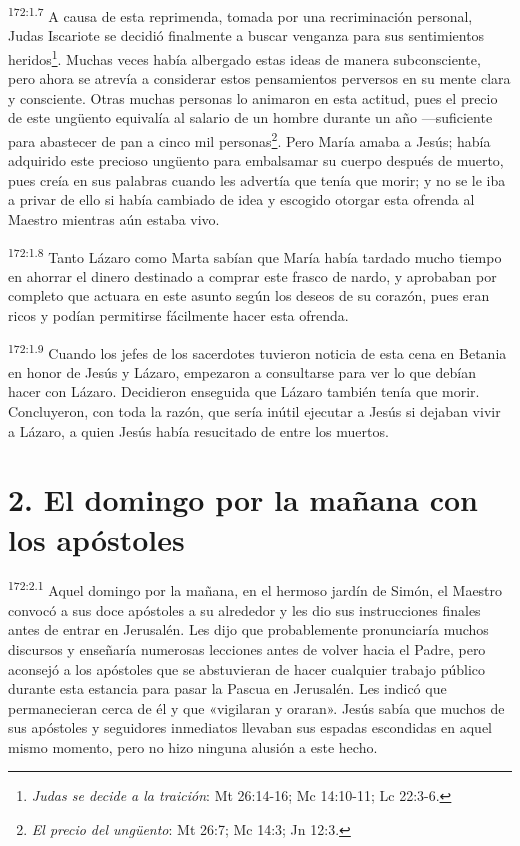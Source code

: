 \par
\textsuperscript{172:1.7} A causa de esta reprimenda, tomada por una recriminación personal, Judas Iscariote se decidió finalmente a buscar venganza para sus sentimientos heridos\footnote{\textit{Judas se decide a la traición}: Mt 26:14-16; Mc 14:10-11; Lc 22:3-6.}. Muchas veces había albergado estas ideas de manera subconsciente, pero ahora se atrevía a considerar estos pensamientos perversos en su mente clara y consciente. Otras muchas personas lo animaron en esta actitud, pues el precio de este ung\"uento equivalía al salario de un hombre durante un año ---suficiente para abastecer de pan a cinco mil personas\footnote{\textit{El precio del ung\"uento}: Mt 26:7; Mc 14:3; Jn 12:3.}. Pero María amaba a Jesús; había adquirido este precioso ung\"uento para embalsamar su cuerpo después de muerto, pues creía en sus palabras cuando les advertía que tenía que morir; y no se le iba a privar de ello si había cambiado de idea y escogido otorgar esta ofrenda al Maestro mientras aún estaba vivo.

\par
\textsuperscript{172:1.8} Tanto Lázaro como Marta sabían que María había tardado mucho tiempo en ahorrar el dinero destinado a comprar este frasco de nardo, y aprobaban por completo que actuara en este asunto según los deseos de su corazón, pues eran ricos y podían permitirse fácilmente hacer esta ofrenda.

\par
\textsuperscript{172:1.9} Cuando los jefes de los sacerdotes tuvieron noticia de esta cena en Betania en honor de Jesús y Lázaro, empezaron a consultarse para ver lo que debían hacer con Lázaro. Decidieron enseguida que Lázaro también tenía que morir. Concluyeron, con toda la razón, que sería inútil ejecutar a Jesús si dejaban vivir a Lázaro, a quien Jesús había resucitado de entre los muertos.

\section*{2. El domingo por la mañana con los apóstoles}
\par
\textsuperscript{172:2.1} Aquel domingo por la mañana, en el hermoso jardín de Simón, el Maestro convocó a sus doce apóstoles a su alrededor y les dio sus instrucciones finales antes de entrar en Jerusalén. Les dijo que probablemente pronunciaría muchos discursos y enseñaría numerosas lecciones antes de volver hacia el Padre, pero aconsejó a los apóstoles que se abstuvieran de hacer cualquier trabajo público durante esta estancia para pasar la Pascua en Jerusalén. Les indicó que permanecieran cerca de él y que «vigilaran y oraran». Jesús sabía que muchos de sus apóstoles y seguidores inmediatos llevaban sus espadas escondidas en aquel mismo momento, pero no hizo ninguna alusión a este hecho.

